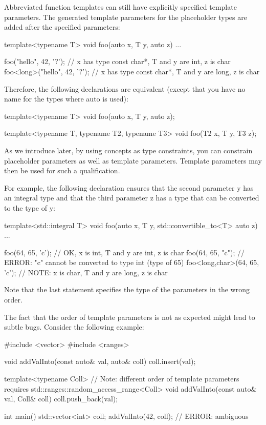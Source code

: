 Abbreviated function templates can still have explicitly specified template parameters. The generated template parameters for the placeholder types are added after the specified parameters:

\begin{cpp}
template<typename T>
void foo(auto x, T y, auto z)
{
	...
}

foo("hello", 42, '?'); // x has type const char*, T and y are int, z is char
foo<long>("hello", 42, '?'); // x has type const char*, T and y are long, z is char
\end{cpp}

Therefore, the following declarations are equivalent (except that you have no name for the types where auto is used):

\begin{cpp}
template<typename T>
void foo(auto x, T y, auto z);

template<typename T, typename T2, typename T3>
void foo(T2 x, T y, T3 z);
\end{cpp}

As we introduce later, by using concepts as type constraints, you can constrain placeholder parameters as well as template parameters. Template parameters may then be used for such a qualification.

For example, the following declaration ensures that the second parameter y has an integral type and that the third parameter z has a type that can be converted to the type of y:

\begin{cpp}
template<std::integral T>
void foo(auto x, T y, std::convertible_to<T> auto z)
{
	...
}

foo(64, 65, 'c'); // OK, x is int, T and y are int, z is char
foo(64, 65, "c"); // ERROR: "c" cannot be converted to type int (type of 65)
foo<long,char>(64, 65, 'c'); // NOTE: x is char, T and y are long, z is char
\end{cpp}

Note that the last statement specifies the type of the parameters in the wrong order.

The fact that the order of template parameters is not as expected might lead to subtle bugs. Consider the following example:


\begin{cpp}
#include <vector>
#include <ranges>

void addValInto(const auto& val, auto& coll)
{
	coll.insert(val);
}

template<typename Coll> // Note: different order of template parameters
requires std::ranges::random_access_range<Coll>
void addValInto(const auto& val, Coll& coll)
{
	coll.push_back(val);
}

int main()
{
	std::vector<int> coll;
	addValInto(42, coll); // ERROR: ambiguous
}
\end{cpp}

